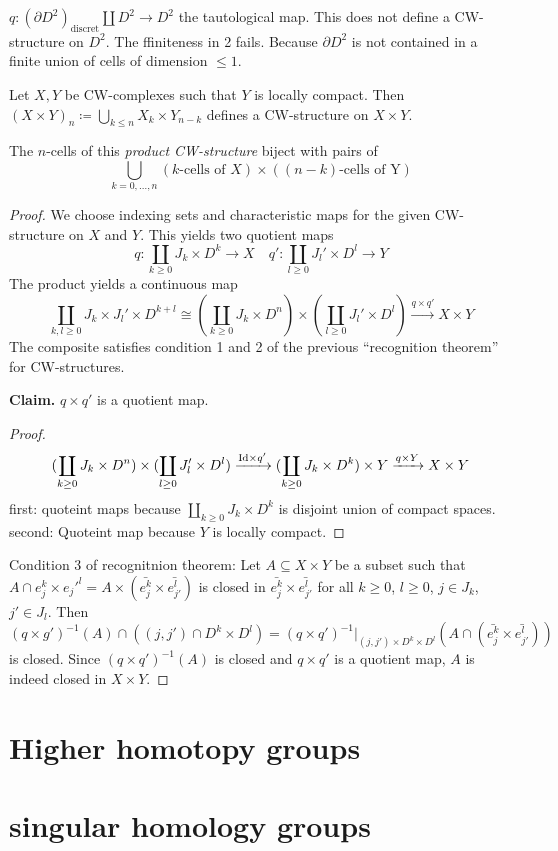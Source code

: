 \documentclass{TemplateLecture}
\begin{document}
\(q\colon (\partial D^2)_{\text{discret}} \amalg D^2 \to D^2\) the tautological map. This does not define a CW-structure on \(D^2\). The ffiniteness in 2 fails. Because \(\partial D^2\) is not contained in a finite union of cells of dimension \(\leq 1\).

\begin{thm}{}{}
    Let \(X,Y\) be CW-complexes such that \(Y\) is locally compact. Then \((X\times Y)_n \coloneq \bigcup_{k \leq n} X_k \times Y_{n-k}\) defines a CW-structure on \(X \times Y\).

    The \(n\)-cells of this \emph{product CW-structure} biject with pairs of
    \[\bigcup_{k = 0, \dots, n} (k \text{-cells of } X) \times ((n-k)\text{-cells of Y})\]
\end{thm}
\begin{proof}
    We choose indexing sets and characteristic maps for the given CW-structure on \(X\) and \(Y\). This yields two quotient maps
    \[q\colon \coprod_{k \geq 0} J_k \times D^k \to X \quad q'\colon \coprod_{l \geq 0} J_l' \times D^l \to Y\]
    The product yields a continuous map
    \[\coprod_{k,l \geq 0} J_k \times J_l' \times D^{k+l} \cong (\coprod_{k \geq 0} J_k \times D^n) \times (\coprod_{l \geq 0} J_l' \times D^l) \xrightarrow{q\times q'} X\times Y\]
    The composite satisfies condition 1 and 2 of the previous \enquote{recognition theorem} for CW-structures.

    \textbf{Claim.} \(q\times q'\) is a quotient map.
    \begin{proof}
        \[(\coprod_{k \geq 0} J_k \times D^n) \times (\coprod_{l \geq 0} J'_l \times D^l) \xrightarrow{\mathrm{Id} \times q'} (\coprod_{k \geq 0} J_k \times D^k)\times Y \xrightarrow{q \times Y} X\times Y\]
        first: quoteint maps  because \(\coprod_{k \geq 0} J_k \times D^k\) is disjoint union of compact spaces.
        second: Quoteint map because \(Y\) is locally compact.
    \end{proof}
    Condition 3 of recognitnion theorem: Let \(A \subseteq X\times Y\) be a subset such that \(A \cap e_j^k \times e_j'^l = A \times (\bar{e_j^k} \times \bar{e_{j'}^l})\) is closed in \(\bar{e_j^k} \times \bar{e_{j'}^l}\) for all \(k \geq 0\), \(l \geq 0\), \(j \in J_k\), \(j' \in J_l\).
    Then \((q\times g')^{-1}(A) \cap ((j,j') \cap D^k \times D^l) = (q \times q')^{-1}\rvert_{(j,j') \times D^k \times D^l}(A \cap(\bar{e_j^k} \times \bar{e_{j'}^l}))\) is closed. Since \((q\times q')^{-1}(A)\) is closed and \(q\times q'\) is a quotient map, \(A \) is indeed closed in \(X \times Y\).
\end{proof}




\section{Higher homotopy groups}

\section{singular homology groups}
\end{document}
